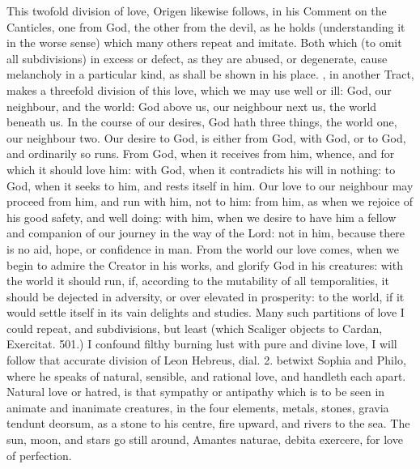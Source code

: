 {This twofold division of love, Origen likewise follows, in his Comment
on the Canticles, one from God, the other from the devil, as he holds
(understanding it in the worse sense) which many others repeat and
imitate. Both which (to omit all subdivisions) in excess or defect, as
they are abused, or degenerate, cause melancholy in a particular kind,
as shall be shown in his place. \Austin{}, in another Tract, makes a
threefold division of this love, which we may use well or ill:
God, our neighbour, and the world: God above us, our neighbour
next us, the world beneath us. In the course of our desires, God hath
three things, the world one, our neighbour two. Our desire to God, is
either from God, with God, or to God, and ordinarily so runs. From God,
when it receives from him, whence, and for which it should love him:
with God, when it contradicts his will in nothing: to God, when it
seeks to him, and rests itself in him. Our love to our neighbour may
proceed from him, and run with him, not to him: from him, as when we
rejoice of his good safety, and well doing: with him, when we desire to
have him a fellow and companion of our journey in the way of the Lord:
not in him, because there is no aid, hope, or confidence in man. From
the world our love comes, when we begin to admire the Creator in his
works, and glorify God in his creatures: with the world it should run,
if, according to the mutability of all temporalities, it should be
dejected in adversity, or over elevated in prosperity: to the world, if
it would settle itself in its vain delights and studies. Many such
partitions of love I could repeat, and subdivisions, but least (which
Scaliger objects to Cardan, Exercitat. 501.) I confound filthy
burning lust with pure and divine love, I will follow that accurate
division of Leon Hebreus, dial. 2. betwixt Sophia and Philo, where he
speaks of natural, sensible, and rational love, and handleth each
apart. Natural love or hatred, is that sympathy or antipathy which is
to be seen in animate and inanimate creatures, in the four elements,
metals, stones, gravia tendunt deorsum, as a stone to his centre, fire
upward, and rivers to the sea. The sun, moon, and stars go still
around, Amantes naturae, debita exercere, for love of perfection.

}
